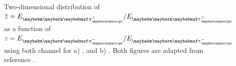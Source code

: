 \begin{figure}[htbp]
\begin{subfigure}[t]{0.45\textwidth}
    \caption{\HiggsToTauTau}
    \label{fig:theoryTauPairCorrelationH}
  \end{subfigure}
\caption[Two-dimensional distribution of \ZToTauTau and \HiggsToTauTau.]
{Two-dimensional distribution of $\overline{z} ={E_{\Ppiplus}}/{E_{\APtauon}}$ as a function of $ z ={E_{\Ppiminus}}/{E_{\Ptauon}}$  using both \tauToPion channel for a) \ZToTauTau, and b) \HiggsToTauTau.  Both figures are adapted from reference \cite{Tsai:1971vv}.}
\label{fig:theoryTauPairCorrelation}
\end{figure} 